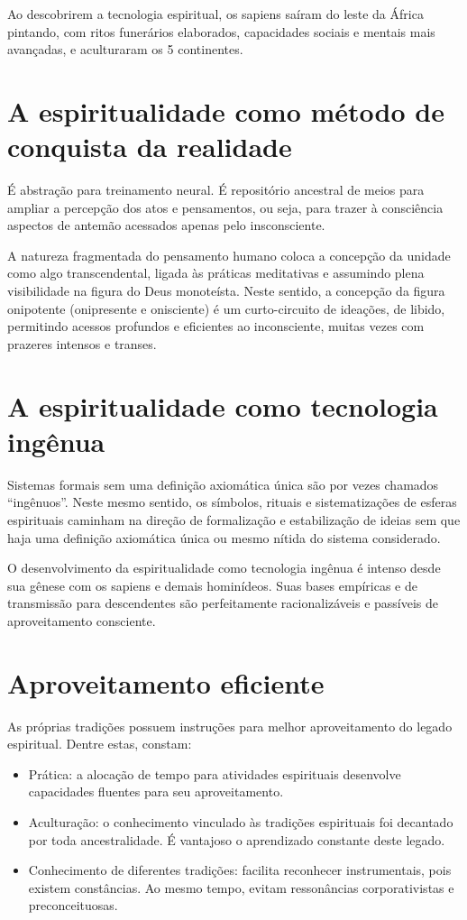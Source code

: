 \documentclass[a4paper]{article}
\begin{document}
Ao descobrirem a tecnologia espiritual, os sapiens
saíram do leste da África pintando,
com ritos funerários elaborados,
capacidades sociais e mentais mais avançadas,
e aculturaram os 5 continentes.

\section{A espiritualidade como método de conquista da realidade}\label{met}
É abstração para treinamento neural. É repositório ancestral de meios para ampliar a percepção dos atos e pensamentos, ou seja, para trazer à consciência aspectos de antemão acessados apenas pelo insconsciente.

A natureza fragmentada do pensamento humano coloca a concepção da unidade como algo transcendental, ligada às práticas meditativas e assumindo plena visibilidade na figura do Deus monoteísta. Neste sentido, a concepção da figura onipotente (onipresente e onisciente) é um curto-circuito de ideações, de libido, permitindo acessos profundos e eficientes ao inconsciente, muitas vezes com prazeres intensos e transes.

\section{A espiritualidade como tecnologia ingênua}
Sistemas formais sem uma definição axiomática única são por vezes chamados ``ingênuos''. Neste mesmo sentido, os símbolos, rituais e sistematizações de esferas espirituais caminham na direção de formalização e estabilização de ideias sem que haja uma definição axiomática única ou mesmo nítida do sistema considerado.

O desenvolvimento da espiritualidade como tecnologia ingênua é intenso desde sua gênese com os sapiens e demais hominídeos. Suas bases empíricas e de transmissão para descendentes são perfeitamente racionalizáveis e passíveis de aproveitamento consciente.

\section{Aproveitamento eficiente}
As próprias tradições possuem instruções para melhor aproveitamento do legado espiritual. Dentre estas, constam:
\begin{itemize}
    \item Prática: a alocação de tempo para atividades espirituais desenvolve capacidades fluentes para seu aproveitamento.
    \item Aculturação: o conhecimento vinculado às tradições espirituais foi decantado por toda ancestralidade. É vantajoso o aprendizado constante deste legado.
    \item Conhecimento de diferentes tradições: facilita reconhecer instrumentais, pois existem constâncias. Ao mesmo tempo, evitam ressonâncias corporativistas e preconceituosas.
\end{itemize}
\end{document}
